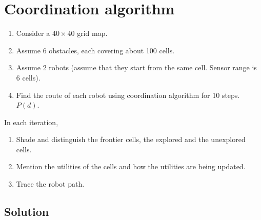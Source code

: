 \section*{Coordination algorithm}

\begin{enumerate}[noitemsep, leftmargin=0.5cm]
    \item Consider a \( 40 \times 40 \) grid map.

    \item Assume 6 obstacles, each covering about 100 cells.

    \item Assume 2 robots (assume that they start from the same cell. Sensor range is 6 cells).

    \item Find the route of each robot using coordination algorithm for 10 steps. \( P(d) \).
\end{enumerate}
In each iteration,
\begin{enumerate}[noitemsep]
    \item Shade and distinguish the frontier cells, the explored and the unexplored cells.

    \item Mention the utilities of the cells and how the utilities are being updated.

    \item Trace the robot path.
\end{enumerate}

\subsection*{Solution}
